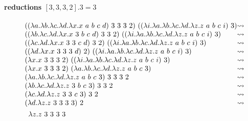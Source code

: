 \documentclass{article}
\newcommand{\lam}[2]{\ensuremath{\lambda#1.#2}}
\begin{document}
\paragraph{reductions $[3,3,3,2].3=3$}
\begin{align*}
    &\begin{array}{l @{\leadsto}l}
        ((\lam{a}\lam{b}\lam{c}\lam{d}\lam{x}{x\ a\ b\ c\ d})\ 3\ 3\ 3\ 2)\ ((\lam{i}\lam{a}\lam{b}\lam{c}\lam{d}{\lam{z}{z\ a\ b\ c\ i}})\ 3) \\
        ((\lam{b}\lam{c}\lam{d}\lam{x}{x\ 3\ b\ c\ d})\ 3\ 3\ 2)\ ((\lam{i}\lam{a}\lam{b}\lam{c}\lam{d}{\lam{z}{z\ a\ b\ c\ i}})\ 3) \\
        ((\lam{c}\lam{d}\lam{x}{x\ 3\ 3\ c\ d})\ 3\ 2)\ ((\lam{i}\lam{a}\lam{b}\lam{c}\lam{d}{\lam{z}{z\ a\ b\ c\ i}})\ 3) \\
        ((\lam{d}\lam{x}{x\ 3\ 3\ 3\ d})\ 2)\ ((\lam{i}\lam{a}\lam{b}\lam{c}\lam{d}{\lam{z}{z\ a\ b\ c\ i}})\ 3) \\
        (\lam{x}{x\ 3\ 3\ 3\ 2})\ ((\lam{i}\lam{a}\lam{b}\lam{c}\lam{d}{\lam{z}{z\ a\ b\ c\ i}})\ 3) \\
        (\lam{x}{x\ 3\ 3\ 3\ 2})\ (\lam{a}\lam{b}\lam{c}\lam{d}{\lam{z}{z\ a\ b\ c\ 3}}) \\
        (\lam{a}\lam{b}\lam{c}\lam{d}{\lam{z}{z\ a\ b\ c\ 3}})\ 3\ 3\ 3\ 2 \\
        (\lam{b}\lam{c}\lam{d}{\lam{z}{z\ 3\ b\ c\ 3}})\ 3\ 3\ 2 \\
        (\lam{c}\lam{d}{\lam{z}{z\ 3\ 3\ c\ 3}})\ 3\ 2 \\
        (\lam{d}{\lam{z}{z\ 3\ 3\ 3\ 3}})\ 2 \\
    \end{array} \\
    & \quad \lam{z}{z\ 3\ 3\ 3\ 3}
\end{align*}
\end{document}
